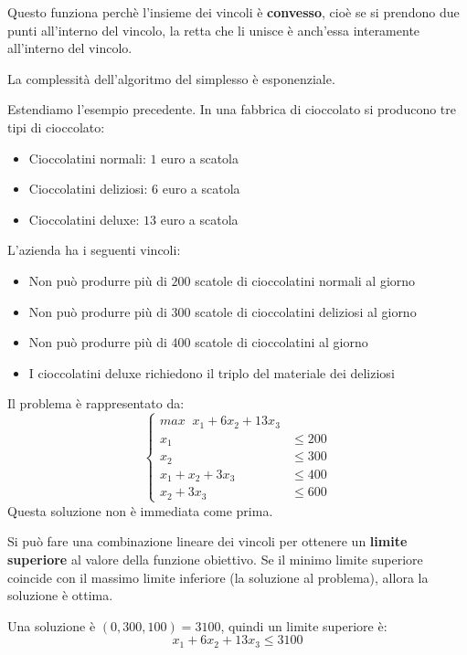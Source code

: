\documentclass[a4paper]{article}
\begin{document}
Questo funziona perchè l'insieme dei vincoli è
\textbf{convesso}, cioè se si prendono due punti all'interno del vincolo, la retta
che li unisce è anch'essa interamente all'interno del vincolo.

La complessità dell'algoritmo del simplesso è esponenziale.

\begin{example}
  Estendiamo l'esempio precedente. 
  In una fabbrica di cioccolato si producono tre tipi di cioccolato:
  \begin{itemize}
    \item Cioccolatini normali: \( 1 \) euro a scatola
    \item Cioccolatini deliziosi: \( 6 \) euro a scatola
    \item Cioccolatini deluxe: \( 13 \) euro a scatola
  \end{itemize}
  L'azienda ha i seguenti vincoli:
  \begin{itemize}
    \item Non può produrre più di \( 200 \) scatole di cioccolatini normali al giorno
    \item Non può produrre più di \( 300 \) scatole di cioccolatini deliziosi al giorno
    \item Non può produrre più di \( 400 \) scatole di cioccolatini al giorno
    \item I cioccolatini deluxe richiedono il triplo del materiale dei deliziosi
  \end{itemize}
  Il problema è rappresentato da:
  \[
    \begin{cases}
      max \;\; x_1 + 6 x_2 + 13 x_3\\
      x_1 & \le 200\\
      x_2 & \le 300\\
      x_1 + x_2 + 3 x_3 & \le 400\\
      x_2 + 3x_3 & \le 600
    \end{cases}
  \] 
  Questa soluzione non è immediata come prima.

  Si può fare una combinazione lineare dei vincoli per ottenere un \textbf{limite
  superiore} al valore della funzione obiettivo. Se il minimo limite superiore coincide
  con il massimo limite inferiore (la soluzione al problema), allora la soluzione è ottima.

  Una soluzione è \( (0, 300, 100) = 3100 \), quindi un limite superiore è:
  \[
    x_1 + 6x_2 + 13x_3 \le 3100
  \] 


\end{example}
\end{document}
